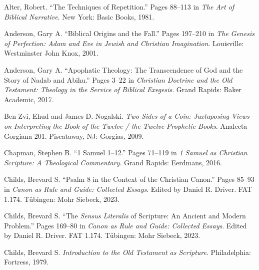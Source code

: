 \documentclass[titlepage]{article}
\begin{document}
\begingroup
\renewcommand{\section}[2]{}%
\begin{thebibliography}{99}
\makeatletter%
\addtocounter{\@listctr}{14}
\makeatother

 Alter, Robert. “The Techniques of Repetition.” Pages 88–113 in \emph{The Art of Biblical Narrative}. New York: Basic Books, 1981.

 Anderson, Gary A. “Biblical Origins and the Fall.” Pages 197–210 in \emph{The Genesis of Perfection: Adam and Eve in Jewish and Christian Imagination}. Louisville: Westminster John Knox, 2001.

 Anderson, Gary A. “Apophatic Theology: The Transcendence of God and the Story of Nadab and Abihu.” Pages 3–22 in \emph{Christian Doctrine and the Old Testament: Theology in the Service of Biblical Exegesis}. Grand Rapids: Baker Academic, 2017.

 Ben Zvi, Ehud and James D. Nogalski. \emph{Two Sides of a Coin: Juxtaposing Views on Interpreting the Book of the Twelve / the Twelve Prophetic Books}. Analecta Gorgiana 201. Piscataway, NJ: Gorgias, 2009.

 Chapman, Stephen B. “1 Samuel 1–12.” Pages 71–119 in \emph{1 Samuel as Christian Scripture: A Theological Commentary}. Grand Rapids: Eerdmans, 2016.

 Childs, Brevard S. “Psalm 8 in the Context of the Christian Canon.” Pages 85--93 in \emph{Canon as Rule and Guide: Collected Essays}. Edited by Daniel R. Driver. FAT 1.174. Tübingen: Mohr Siebeck, 2023.

 Childs, Brevard S. “The \emph{Sensus Literalis} of Scripture: An Ancient and Modern Problem.” Pages 169--80 in \emph{Canon as Rule and Guide: Collected Essays}. Edited by Daniel R. Driver. FAT 1.174. Tübingen: Mohr Siebeck, 2023.

 Childs, Brevard S. \emph{Introduction to the Old Testament as Scripture}. Philadelphia: Fortress, 1979.




\end{thebibliography}
\end{document}

